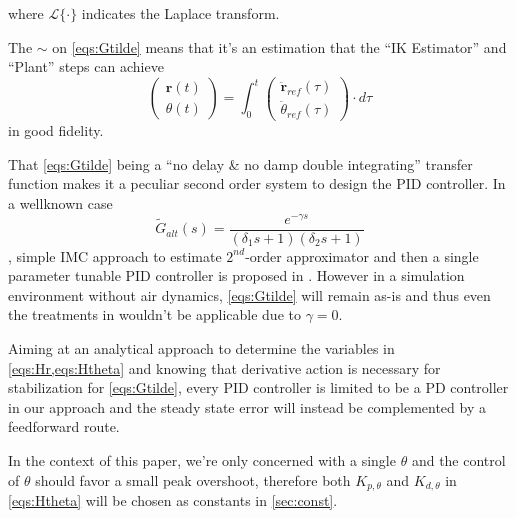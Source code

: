 \documentclass[notitlepage,twocolumn,10pt]{article}
\begin{document}
where $\mathcal{L}\{\cdot\}$ indicates the Laplace transform. 

The $\sim$ on \cref{eqs:Gtilde} means that it's an estimation that the ``IK Estimator'' and ``Plant'' steps can achieve
\begin{equation*}
\begin{pmatrix} \mathbf{r}(t) \\ \theta(t) \end{pmatrix} = \int_0^t \begin{pmatrix} \ddot{\mathbf{r}}_{ref}(\tau) \\ \ddot{\theta}_{ref}(\tau) \end{pmatrix} \cdot d \tau
\end{equation*}
in good fidelity. 

That \cref{eqs:Gtilde} being a ``no delay \& no damp double integrating'' transfer function makes it a peculiar second order system to design the PID controller. In a wellknown case    
\begin{equation} \label{GtildeAlt}
  \tilde{G}_{alt}(s) = \frac{e^{-\gamma s}}{(\delta_1 s + 1)(\delta_2  s + 1)}
\end{equation}
, simple IMC approach to estimate $2^{nd}$-order approximator and then a single parameter tunable PID controller is proposed in \cite{skogestad2012simc}. However in a simulation environment without air dynamics, \cref{eqs:Gtilde} will remain as-is and thus even the treatments in \cite{grimholt2016optimal, ruscio2017tuning} wouldn't be applicable due to $\gamma = 0$. 

Aiming at an analytical approach to determine the variables in \cref{eqs:Hr,eqs:Htheta} and knowing that derivative action is necessary for stabilization for \cref{eqs:Gtilde}\cite{grimholt2016optimal}, every PID controller is limited to be a PD controller in our approach and the steady state error will instead be complemented by a feedforward route. 

In the context of this paper, we're only concerned with a single $\theta$ and the control of $\theta$ should favor a small peak overshoot, therefore both $K_{p, \theta}$ and $K_{d, \theta}$ in \cref{eqs:Htheta} will be chosen as constants in \cref{sec:const}.
\end{document}
